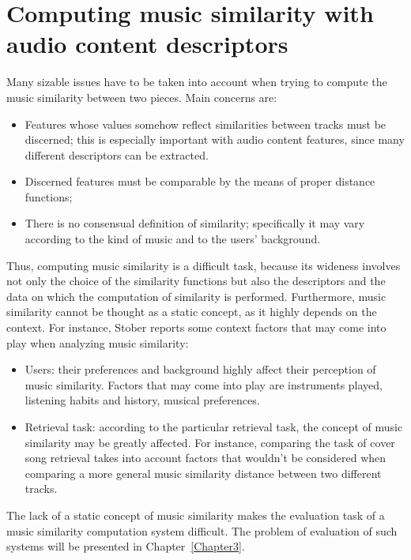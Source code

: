 \section{Computing music similarity with audio content descriptors}
\label{sec:audiocontentsimilarity}
Many sizable issues have to be taken into account when trying to compute the music similarity between two pieces. Main concerns are:
\begin{itemize}
\item Features whose values somehow reflect similarities between tracks must be discerned; this is especially important with audio content features, since many different descriptors can be extracted.
\item Discerned features must be comparable by the means of proper distance functions;
\item There is no consensual definition of similarity; specifically it may vary according to the kind of music and to the users' background.
\end{itemize}

Thus, computing music similarity is a difficult task, because its wideness involves not only the choice of the similarity functions but also the descriptors and the data on which the computation of similarity is performed. 
Furthermore, music similarity cannot be thought as a static concept, as it highly depends on the context. For instance, Stober \cite{stober11} reports some context factors that may come into play when analyzing music similarity:
\begin{itemize}
\item Users: their preferences and background highly affect their perception of music similarity. Factors that may come into play are instruments played, listening habits and history, musical preferences.
\item Retrieval task: according to the particular retrieval task, the concept of music similarity may be greatly affected. For instance, comparing the task of cover song retrieval takes into account factors that wouldn't be considered when comparing a more general music similarity distance between two different tracks.
\end{itemize}

The lack of a static concept of music similarity makes the evaluation task of a music similarity computation system difficult. The problem of evaluation of such systems will be presented in Chapter~\ref{Chapter3}.  \\

